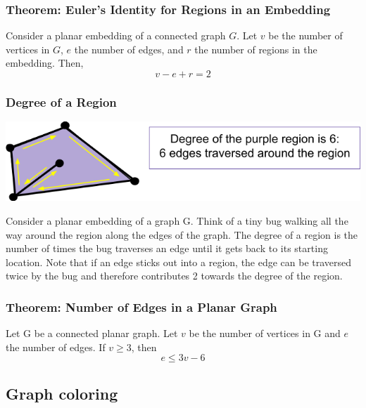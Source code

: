 \subsubsection*{Theorem: Euler's Identity for Regions in an Embedding}
Consider a planar embedding of a connected graph $G$. Let $v$ be the number of vertices in $G$, $e$ the number of edges, and $r$ the number of regions in the embedding. Then,
\[
  v - e + r = 2
\]

\subsubsection*{Degree of a Region}
\begin{center}
  \includegraphics[width=0.7\linewidth]{resources/degree of a region.png}
\end{center}
Consider a planar embedding of a graph G. Think of a tiny bug walking all the way around the region along the edges of the graph. The degree of a region is the number of times the bug traverses an edge until it gets back to its starting location. Note that if an edge sticks out into a region, the edge can be traversed twice by the bug and therefore contributes 2 towards the degree of the region.

\subsubsection*{Theorem: Number of Edges in a Planar Graph}
Let G be a connected planar graph. Let $v$ be the number of vertices in G and $e$ the number of edges. If $v \geq 3$, then
\[
  e \leq 3v-6
\]

\subsection{Graph coloring}
